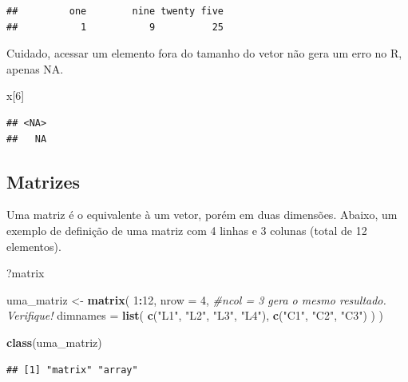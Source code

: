 \documentclass[
]{book}
\newenvironment{Shaded}{\begin{snugshade}}{\end{snugshade}}
\newcommand{\AttributeTok}[1]{\textcolor[rgb]{0.13,0.29,0.53}{#1}}
\newcommand{\CommentTok}[1]{\textcolor[rgb]{0.56,0.35,0.01}{\textit{#1}}}
\newcommand{\DecValTok}[1]{\textcolor[rgb]{0.00,0.00,0.81}{#1}}
\newcommand{\FunctionTok}[1]{\textcolor[rgb]{0.13,0.29,0.53}{\textbf{#1}}}
\newcommand{\NormalTok}[1]{#1}
\newcommand{\OtherTok}[1]{\textcolor[rgb]{0.56,0.35,0.01}{#1}}
\newcommand{\SpecialCharTok}[1]{\textcolor[rgb]{0.81,0.36,0.00}{\textbf{#1}}}
\newcommand{\StringTok}[1]{\textcolor[rgb]{0.31,0.60,0.02}{#1}}
\begin{document}
\begin{verbatim}
##         one        nine twenty five 
##           1           9          25
\end{verbatim}

Cuidado, acessar um elemento fora do tamanho do vetor não gera um erro no R, apenas NA.

\begin{Shaded}
\begin{Highlighting}[]
\NormalTok{x[}\DecValTok{6}\NormalTok{]}
\end{Highlighting}
\end{Shaded}

\begin{verbatim}
## <NA> 
##   NA
\end{verbatim}

\subsection{Matrizes}\label{matrizes}

Uma matriz é o equivalente à um vetor, porém em duas dimensões.
Abaixo, um exemplo de definição de uma matriz com 4 linhas e 3 colunas (total de 12 elementos).

\begin{Shaded}
\begin{Highlighting}[]
\NormalTok{?matrix}
\end{Highlighting}
\end{Shaded}

\begin{Shaded}
\begin{Highlighting}[]
\NormalTok{uma\_matriz }\OtherTok{\textless{}{-}} \FunctionTok{matrix}\NormalTok{(}
      \DecValTok{1}\SpecialCharTok{:}\DecValTok{12}\NormalTok{,}
      \AttributeTok{nrow =} \DecValTok{4}\NormalTok{, }\CommentTok{\#ncol = 3 gera o mesmo resultado. Verifique!}
      \AttributeTok{dimnames =} \FunctionTok{list}\NormalTok{(}
        \FunctionTok{c}\NormalTok{(}\StringTok{"L1"}\NormalTok{, }\StringTok{"L2"}\NormalTok{, }\StringTok{"L3"}\NormalTok{, }\StringTok{"L4"}\NormalTok{),}
        \FunctionTok{c}\NormalTok{(}\StringTok{"C1"}\NormalTok{, }\StringTok{"C2"}\NormalTok{, }\StringTok{"C3"}\NormalTok{)}
\NormalTok{      )}
\NormalTok{)}

\FunctionTok{class}\NormalTok{(uma\_matriz)}
\end{Highlighting}
\end{Shaded}

\begin{verbatim}
## [1] "matrix" "array"
\end{verbatim}
\end{document}
